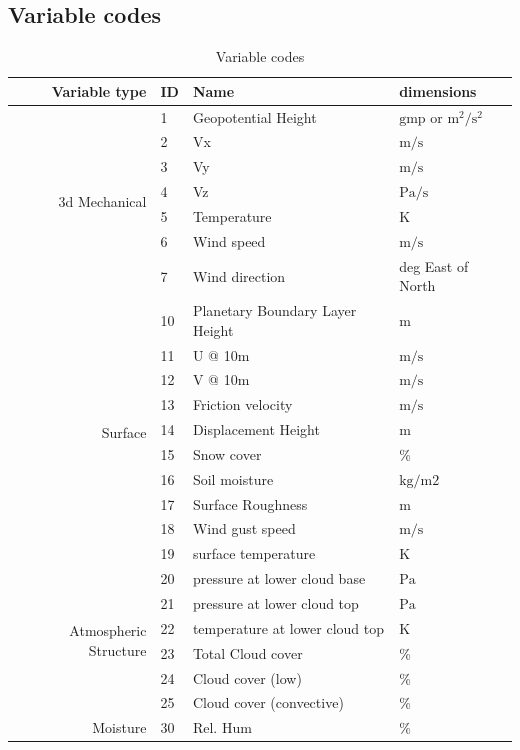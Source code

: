 \documentclass[11pt]{article}   %
\begin{document}
\subsection{Variable codes}\label{ApVar}
\begin{table}[h]\label{TabVar}
\caption{Variable codes}
\small
\begin{tabular}{| r | l | l | l |}
\hline
Variable type & ID & Name & dimensions \\
\hline
\multirow{7}{*}{3d Mechanical} 
 &  1 & Geopotential Height & $\mathrm{gmp}$ or $\mathrm{m^2/s^2}$ \\
 &  2 & Vx & $\mathrm{m/s}$ \\
 &  3 & Vy & $\mathrm{m/s}$ \\
 &  4 & Vz & $\mathrm{Pa/s}$ \\
 &  5 & Temperature  & $\mathrm{K}$ \\
 &  6 & Wind speed & $\mathrm{m/s}$ \\
 &  7 & Wind direction &deg East of North \\
\hline
\multirow{10}{*}{Surface}
 &  10 & Planetary Boundary Layer Height & $\mathrm{m}$ \\
 &  11 & U @ 10m & $\mathrm{m/s}$ \\
 &  12 & V @ 10m & $\mathrm{m/s}$ \\
 &  13 & Friction velocity & $\mathrm{m/s}$ \\
 &  14 & Displacement Height & $\mathrm{m}$ \\
 &  15 & Snow cover & \% \\
 &  16 & Soil moisture & $\mathrm{kg/m2}$ \\
 &  17 & Surface Roughness & $\mathrm{m}$ \\
 &  18 & Wind gust speed & $\mathrm{m/s}$ \\
 &  19 & surface temperature & $\mathrm{K}$ \\
\hline
\multirow{6}{*}{Atmospheric Structure}
 &  20 & pressure at lower cloud base & $\mathrm{Pa}$ \\
 &  21 & pressure at lower cloud top & $\mathrm{Pa}$ \\
 &  22 & temperature at lower cloud top & $\mathrm{K}$ \\
 &  23 & Total Cloud cover & \% \\
 &  24 & Cloud cover (low) & \% \\
 &  25 & Cloud cover (convective) & \% \\
\hline
\multirow{4}{*}{Moisture}
  & 30 & Rel. Hum & \% \\

\end{tabular}
\end{table}
\end{document}
